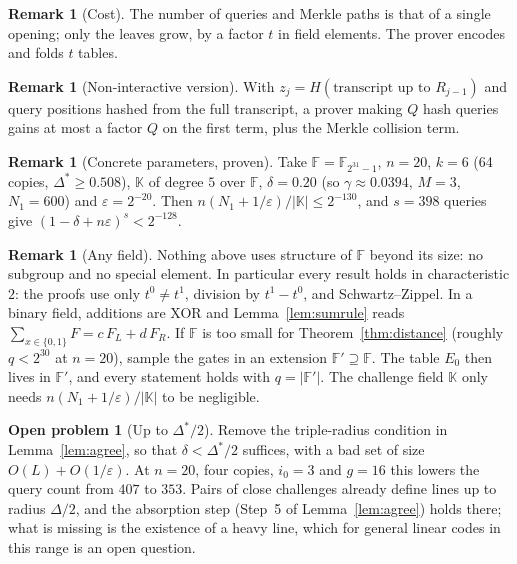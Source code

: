 \documentclass[11pt]{article}
\theoremstyle{definition}
\newtheorem{remark}[theorem]{Remark}
\newtheorem{problem}[theorem]{Open problem}
\newcommand{\F}{\mathbb{F}}
\newcommand{\K}{\mathbb{K}}
\begin{document}
\begin{remark}[Cost]
The number of queries and Merkle paths is that of a single opening; only the leaves grow, by a factor
$t$ in field elements. The prover encodes and folds $t$ tables.
\end{remark}

\begin{remark}[Non-interactive version]
With $z_j=H(\text{transcript up to }R_{j-1})$ and query positions hashed from the full
transcript, a prover making $Q$ hash queries gains at most a factor $Q$ on the first term, plus the
Merkle collision term.
\end{remark}

\begin{remark}[Concrete parameters, proven]
Take $\F=\mathbb{F}_{2^{31}-1}$, $n=20$, $k=6$ (64 copies, $\Delta^{*}\ge0.508$), $\K$ of degree $5$
over $\F$, $\delta=0.20$ (so $\gamma\approx0.0394$, $M=3$, $N_1=600$) and $\varepsilon=2^{-20}$. Then
$n(N_1+1/\varepsilon)/|\K|\le2^{-130}$, and $s=398$ queries give $(1-\delta+n\varepsilon)^{s}<2^{-128}$.
\end{remark}

\begin{remark}[Any field]
Nothing above uses structure of $\F$ beyond its size: no subgroup and no special element. In particular every result holds in characteristic $2$: the proofs use only $t^0\neq t^1$, division by $t^1-t^0$, and Schwartz--Zippel. In a binary field, additions are XOR and Lemma~\ref{lem:sumrule} reads $\sum_{x\in\{0,1\}}F=c\,F_L+d\,F_R$. If
$\F$ is too small for Theorem~\ref{thm:distance} (roughly $q<2^{30}$ at $n=20$), sample the
gates in an extension $\F'\supseteq\F$. The table $E_0$ then lives in $\F'$, and every
statement holds with $q=|\F'|$. The challenge field $\K$ only needs
$n(N_1+1/\varepsilon)/|\K|$ to be negligible.
\end{remark}

\begin{problem}[Up to $\Delta^{*}/2$]
Remove the triple-radius condition in Lemma~\ref{lem:agree}, so that $\delta<\Delta^{*}/2$ suffices, with a
bad set of size $O(L)+O(1/\varepsilon)$. At $n=20$, four copies, $i_0=3$ and $g=16$ this lowers the query
count from $407$ to $353$. Pairs of close challenges already define lines up to radius $\Delta/2$, and the
absorption step (Step~5 of Lemma~\ref{lem:agree}) holds there; what is missing is the existence of a heavy
line, which for general linear codes in this range is an open question.
\end{problem}
\end{document}
